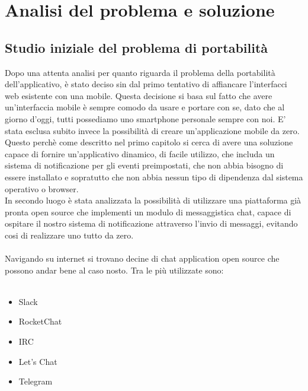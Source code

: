 \section{Analisi del problema e soluzione}


\subsection{Studio iniziale del problema di portabilità}
Dopo una attenta analisi per quanto riguarda il problema della portabilità dell'applicativo, è stato deciso sin dal primo tentativo di affiancare l'interfacci web esistente con una mobile. Questa decisione si basa sul fatto che avere un'interfaccia mobile è sempre comodo da usare e portare con se, dato che al giorno d'oggi, tutti possediamo uno smartphone personale sempre con noi. E' stata esclusa subito invece la possibilità di creare un'applicazione mobile da zero. Questo perchè come descritto nel primo capitolo si cerca di avere una soluzione capace di fornire un'applicativo dinamico, di facile utilizzo, che includa un sistema di notificazione per gli eventi preimpostati, che non abbia bisogno di essere installato e sopratutto che non abbia nessun tipo di dipendenza dal sistema operativo o browser.\\ 
 In secondo luogo è stata analizzata la possibilità di utilizzare una piattaforma già pronta open source che implementi un modulo di messaggistica chat, capace di ospitare il nostro sistema di notificazione attraverso l'invio di messaggi, evitando cosi di realizzare uno tutto da zero.\\\\
Navigando su internet si trovano decine di chat application open source che possono andar bene al caso nosto. Tra le più utilizzate sono: \\\\

\begin{itemize}
\item Slack 
\item RocketChat
\item IRC
\item Let's Chat
\item Telegram 
\end{itemize}


